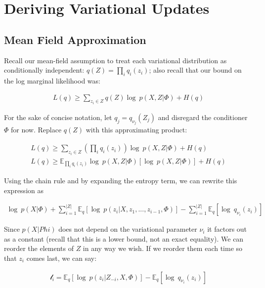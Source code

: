 

\section{Deriving Variational Updates}


\subsection{Mean Field Approximation }

Recall our mean-field assumption to treat each variational distribution as conditionally independent: $q(Z) = \prod\limits_{i} q_i(z_i)$; also recall that our bound on the log marginal likelihood was:


\begin{align} L(q) \geq \sum\limits_{z_i \in Z} q(Z) \log\ p(X,Z|\Phi) + H(q) \end{align}


For the sake of concise notation, let $q_j = q_{\nu_j}(Z_j)$ and disregard the conditioner $\Phi$ for now. Replace $q(Z)$ with this approximating product:

\begin{align} 
\nonumber L(q) \geq \sum\limits_{z_i \in Z} \left( \prod\limits_{i} q_i(z_i) \right) \log\ p(X,Z|\Phi) + H(q) \\
L(q) \geq \mathbb{E}_{ \prod\limits_{i} q_i(z_i) } \log\ p(X,Z|\Phi) [\log\ p(X,Z|\Phi)] + H(q)
\end{align}

Using the chain rule and by expanding the entropy term, we can rewrite this expression as

\begin{align} \log\ p(X|\Phi) + \sum\limits_{i=1}^{| Z|} \mathbb{E}_q [\log\ p(z_i | X, z_1,..., z_{i-1}, \Phi)] - \sum\limits_{i=1}^{| Z|} \mathbb{E}_q[\log\ q_{\nu_i}(z_i)] \end{align}

Since $p(X \vert Phi)$ does not depend on the variational parameter $\nu_i$ it factors out as a constant (recall that this is a lower bound, not an exact equality). We can reorder the elements of $Z$ in any way we wish. If we reorder them each time so that $z_i$ comes last, we can say:

\begin{align} \mathcal{l}_i = \mathbb{E}_q[\log\ p(z_i| Z_{-i}, X, \Phi)] - \mathbb{E}_q[\log\ q_{\nu_i}(z_i)]
\end{align} \citep{blei:2006}

